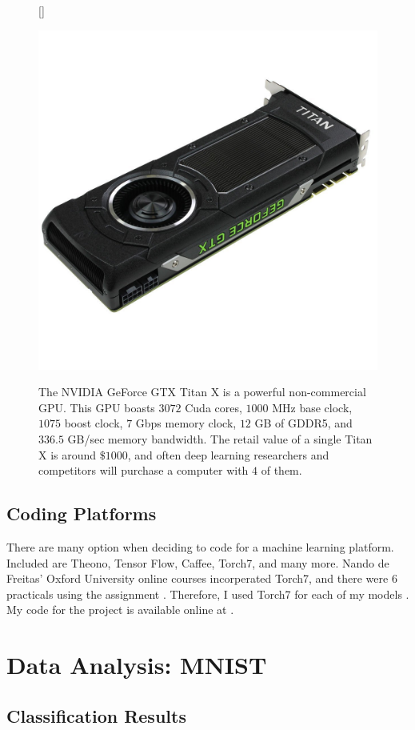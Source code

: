 \message{ !name(main.tex)}\documentclass[11pt]{article}
\begin{document}
\begin{figure}[H]
  [\FBwidth]
  {\caption{The NVIDIA GeForce GTX Titan X is a powerful non-commercial GPU. This GPU boasts $3072$ Cuda cores, $1000$ MHz base clock, $1075$ boost clock, $7$ Gbps memory clock, $12$ GB of GDDR5, and $336.5$ GB/sec memory bandwidth. The retail value of a single Titan X is around $\$1000$, and often deep learning researchers and competitors will purchase a computer with $4$ of them.
    }\label{fig:titanx}}{\includegraphics[width=0.65\linewidth]{titanx}}
\end{figure}


\subsection{Coding Platforms}
There are many option when deciding to code for a machine learning platform. Included are Theono, Tensor Flow, Caffee, Torch7, and many more. Nando de Freitas' Oxford University online courses incorperated Torch7, and there were $6$ practicals using the assignment \cite{Freitas}. Therefore, I used Torch7 for each of my models \cite{torch}. My code for the project is available online at \cite{Kent}.

\section{Data Analysis: MNIST}
\subsection{Classification Results}
\end{document}
